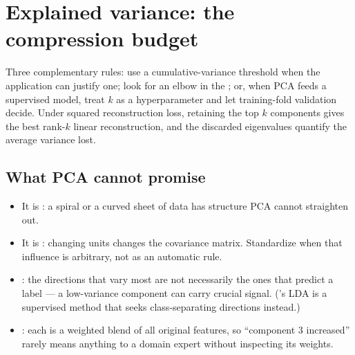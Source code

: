 \section{Explained variance: the compression budget}

\begin{mlfigure}
\end{mlfigure}

Three complementary rules: use a cumulative-variance threshold when the application can justify one; look for an elbow in the ; or, when PCA feeds a supervised model, treat $k$ as a hyperparameter and let training-fold validation decide. Under squared reconstruction loss, retaining the top $k$ components gives the best rank-$k$ linear reconstruction, and the discarded eigenvalues quantify the average variance lost.

\subsection{What PCA cannot promise}
\label{sec:pca-limitations}

\begin{itemize}
  \item It is : a spiral or a curved sheet of data has structure PCA cannot straighten out.
  \item It is : changing units changes the covariance matrix. Standardize when that influence is arbitrary, not as an automatic rule.
  \item {}: the directions that vary most are not necessarily the ones that predict a label --- a low-variance component can carry crucial signal. ('s LDA is a supervised method that seeks class-separating directions instead.)
  \item {}: each is a weighted blend of all original features, so ``component 3 increased'' rarely means anything to a domain expert without inspecting its weights.
\end{itemize}

